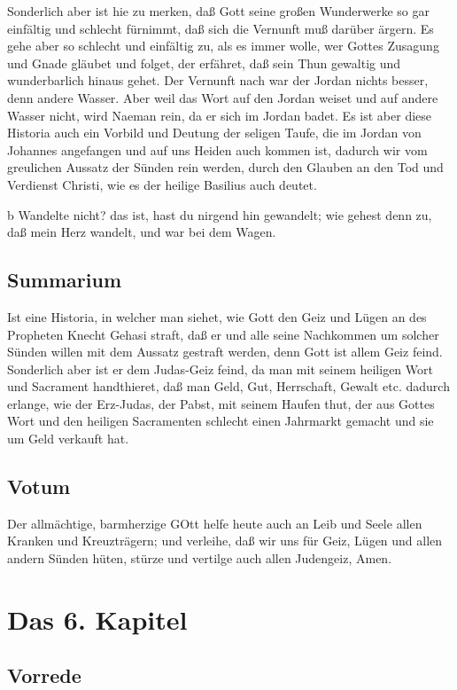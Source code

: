 Sonderlich aber ist hie zu merken, daß Gott seine großen Wunderwerke so gar einfältig und schlecht fürnimmt, daß sich die Vernunft muß darüber ärgern. Es gehe aber so schlecht und einfältig zu, als es immer wolle, wer Gottes Zusagung und Gnade gläubet und folget, der erfähret, daß sein Thun gewaltig und wunderbarlich hinaus gehet. Der Vernunft nach war der Jordan nichts besser, denn andere Wasser. Aber weil das Wort auf den Jordan weiset und auf andere Wasser nicht, wird Naeman rein, da er sich im Jordan badet. Es ist aber diese Historia auch ein Vorbild und Deutung der seligen Taufe, die im Jordan von Johannes angefangen und auf uns Heiden auch kommen ist, dadurch wir vom greulichen Aussatz der Sünden rein werden, durch den Glauben an den Tod und Verdienst Christi, wie es der heilige Basilius auch deutet.

b Wandelte nicht? das ist, hast du nirgend hin gewandelt; wie gehest denn zu, daß mein Herz wandelt, und war bei dem Wagen.

\section{Summarium}

Ist eine Historia, in welcher man siehet, wie Gott den Geiz und Lügen an des Propheten Knecht Gehasi straft, daß er und alle seine Nachkommen um solcher Sünden willen mit dem Aussatz gestraft werden, denn Gott ist allem Geiz feind. Sonderlich aber ist er dem Judas-Geiz feind, da man mit seinem heiligen Wort und Sacrament handthieret, daß man Geld, Gut, Herrschaft, Gewalt etc. dadurch erlange, wie der Erz-Judas, der Pabst, mit seinem Haufen thut, der aus Gottes Wort und den heiligen Sacramenten schlecht einen Jahrmarkt gemacht und sie um Geld verkauft hat.

\section{Votum}

Der allmächtige, barmherzige GOtt helfe heute auch an Leib und Seele allen Kranken und Kreuzträgern; und verleihe, daß wir uns für Geiz, Lügen und allen andern Sünden hüten, stürze und vertilge auch allen Judengeiz, Amen.

\chapter{Das 6. Kapitel}

\section{Vorrede}

